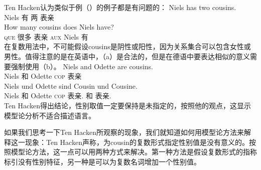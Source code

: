 \noindent
Ten Hacken认为类似于例（）的例子都是有问题的：
\eal
\ex 
\gll Niels has two cousins.\\
	 Niels 有 两 表亲\\
\ex 
\gll How many cousins does Niels have?\\
	\textsc{que} 很多 表亲 \textsc{aux} Niels 有\\
\zl
在复数用法中，不可能假设cousins是阴性或阳性，因为关系集合可以包含女性或男性。值得注意的是在英语中，（a）是合法的，但是在德语中要表达相似的意义需要强制使用（b）。
\eal
\ex 
\gll Niels and Odette are cousins.\\
	Niels 和 Odette \textsc{cop} 表亲\\
\ex 
\gll Niels und Odette sind Cousin und Cousine.\\
	 Niels 和 Odette \textsc{cop} 表亲.\mas{} 和 表亲.\fem\\
\zl
Ten Hacken得出结论，性别取值一定要保持是未指定的，按照他的观点，这显示模型论分析不适合描述语言。

如果我们思考一下Ten Hacken所观察的现象，我们就知道如何用模型论方法来解释这一现象：Ten Hacken声称，为cousin的复数形式指定性别值是没有意义的。按照模型论方法，这一点可以用两种方式来解决。第一种方法是假设复数形式的指称标引没有性别特征，另一种是可以为复数名词增加一个性别值。

